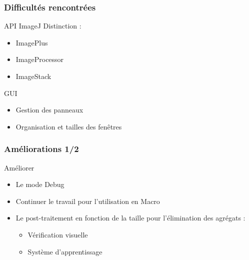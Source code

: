 \documentclass[11pt]{beamer}
\begin{document}
\begin{frame}
\frametitle{Difficultés rencontrées}
	\begin{block}{API ImageJ}
	Distinction :
		\begin{itemize}
			\item ImagePlus
			\item ImageProcessor
			\item ImageStack
		\end{itemize}
	\end{block}
	\begin{block}{GUI}
		\begin{itemize}
			\item Gestion des panneaux
			\item Organisation et tailles des fenêtres
		\end{itemize}
	\end{block}
\end{frame}

\begin{frame}
\frametitle{Améliorations 1/2}
	\begin{block}{Améliorer}
		\begin{itemize}
			\item Le mode Debug
			\item Continuer le travail pour l'utilisation en Macro
			\item Le post-traitement en fonction de la taille pour l'élimination des agrégats :
			\begin{itemize}
				\item Vérification visuelle
				\item Système d'apprentissage 
			\end{itemize}
		\end{itemize}
	\end{block}
	
\end{frame}
\end{document}
